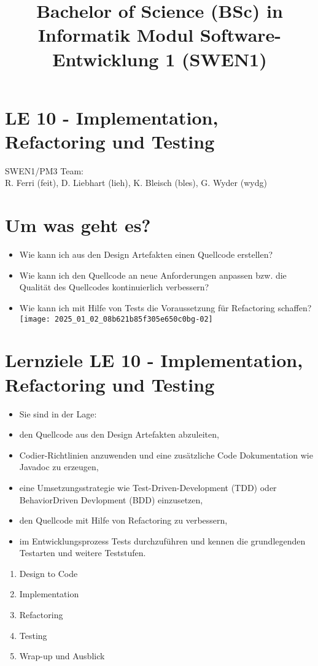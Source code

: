 \documentclass[10pt]{article}
\title{Bachelor of Science (BSc) in Informatik Modul Software-Entwicklung 1 (SWEN1) }
\author{}
\date{}
\begin{document}
\maketitle
\section*{LE 10 - Implementation, Refactoring und Testing}
SWEN1/PM3 Team:\\
R. Ferri (feit), D. Liebhart (lieh), K. Bleisch (bles), G. Wyder (wydg)

\section*{Um was geht es?}
\begin{itemize}
  \item Wie kann ich aus den Design Artefakten einen Quellcode erstellen?
  \item Wie kann ich den Quellcode an neue Anforderungen anpassen bzw. die Qualität des Quellcodes kontinuierlich verbessern?
  \item Wie kann ich mit Hilfe von Tests die Voraussetzung für Refactoring schaffen?\\
\texttt{[image: 2025\_01\_02\_08b621b85f305e650c0bg-02]}
\end{itemize}

\section*{Lernziele LE 10 - Implementation, Refactoring und Testing}
\begin{itemize}
  \item Sie sind in der Lage:
  \item den Quellcode aus den Design Artefakten abzuleiten,
  \item Codier-Richtlinien anzuwenden und eine zusätzliche Code Dokumentation wie Javadoc zu erzeugen,
  \item eine Umsetzungsstrategie wie Test-Driven-Development (TDD) oder BehaviorDriven Devlopment (BDD) einzusetzen,
  \item den Quellcode mit Hilfe von Refactoring zu verbessern,
  \item im Entwicklungsprozess Tests durchzuführen und kennen die grundlegenden Testarten und weitere Teststufen.
\end{itemize}

\begin{enumerate}
  \item Design to Code
  \item Implementation
  \item Refactoring
  \item Testing
  \item Wrap-up und Ausblick
\end{enumerate}
\end{document}
